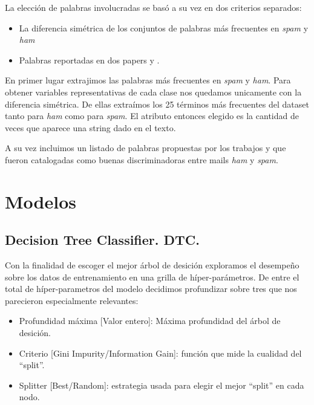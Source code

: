 \documentclass[a4paper,10pt]{article}
\begin{document}
\par La elección de palabras involucradas se basó a su vez en dos criterios separados: 
\begin{itemize}
 \item La diferencia sim\'etrica de los conjuntos de palabras m\'as frecuentes en \emph{spam} y \emph{ham}
\item Palabras reportadas en dos papers \cite{Gunal} y \cite{Vaughan}. 
\end{itemize}

En primer lugar extrajimos las palabras m\'as frecuentes en \emph{spam} y \emph{ham}. Para obtener variables representativas de cada clase nos quedamos unicamente con la diferencia sim\'etrica. De ellas extraímos los 25 términos más frecuentes del dataset tanto para \emph{ham} como para \emph{spam}. El atributo entonces elegido es la cantidad de veces que aparece una string dado en el texto. 

A su vez incluimos un listado de palabras propuestas por los trabajos \cite{Gunal} y \cite{Vaughan} que fueron catalogadas como buenas discriminadoras entre mails \emph{ham} y \emph{spam}. 



\section{Modelos} \label{sec:modelos}

\subsection{Decision Tree Classifier. DTC.}

\par Con la finalidad de escoger el mejor árbol de desición exploramos 
el desempeño sobre los datos de entrenamiento en una grilla de híper-parámetros.
De entre el total de híper-parametros del modelo decidimos profundizar sobre 
tres que nos parecieron especialmente relevantes:
\begin{itemize}
 \item Profundidad máxima [Valor entero]: Máxima profundidad del árbol de desición. 
 \item Criterio [Gini Impurity/Information Gain]: función que mide la cualidad 
del ``split''. 
  \item Splitter [Best/Random]: estrategia usada para elegir el mejor 
``split'' en cada nodo.
\end{itemize}
\end{document}
